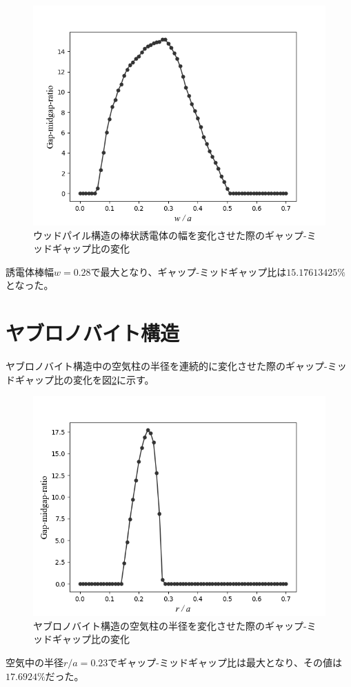 \documentclass[platex,dvipdfmx]{jsreport}
\numberwithin{equation}{section}
\begin{document}
\begin{figure}[htbp]
  \centering
  \includegraphics[width=0.6\linewidth]{results/woodpile.png}
  \caption{ウッドパイル構造の棒状誘電体の幅を変化させた際のギャップ-ミッドギャップ比の変化}
  \label{fig:woodpile}
\end{figure}

誘電体棒幅$w = 0.28$で最大となり、ギャップ-ミッドギャップ比は$15.17613425 \%$となった。

\section{ヤブロノバイト構造}
ヤブロノバイト構造中の空気柱の半径を連続的に変化させた際のギャップ-ミッドギャップ比の変化を図\ref{fig:yablonovite}に示す。
\begin{figure}[htbp]
  \centering
  \includegraphics[width=0.6\linewidth]{results/yablonovite.png}
  \caption{ヤブロノバイト構造の空気柱の半径を変化させた際のギャップ-ミッドギャップ比の変化}
  \label{fig:yablonovite}
\end{figure}

空気中の半径$r / a = 0.23$でギャップ-ミッドギャップ比は最大となり、その値は$17.6924 \%$だった。
\end{document}
